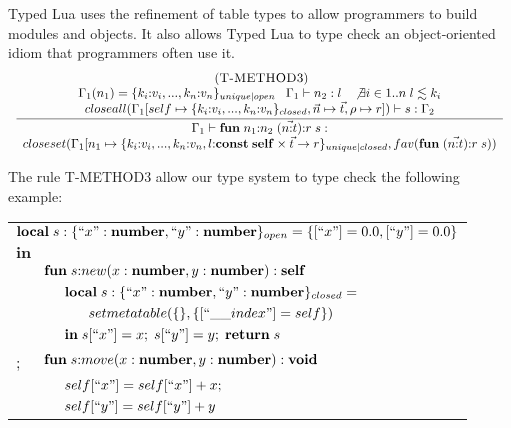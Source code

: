Typed Lua uses the refinement of table types to allow programmers to
build modules and objects.
It also allows Typed Lua to type check an object-oriented idiom that
programmers often use it.
\[
\begin{array}{c}
\; (\textsc{T-METHOD3})\\
\dfrac{\begin{array}{c}
       \Gamma_{1}(n_{1}) = \{k_{i}{:}v_{i}, ..., k_{n}{:}v_{n}\}_{unique|open} \;\;\;
       \Gamma_{1} \vdash n_{2} : l \;\;\;
       \not \exists i \in 1..n \; l \lesssim k_{i}\\
       closeall(\Gamma_{1}[self \mapsto \{k_{i}{:}v_{i}, ..., k_{n}{:}v_{n}\}_{closed}, \vec{n} \mapsto \vec{t}, \rho \mapsto r]) \vdash s:\Gamma_{2}
       \end{array}}
      {\begin{array}{c}
       \Gamma_{1} \vdash \mathbf{fun} \; n_{1}{:}n_{2} \; (\vec{n{:}t}){:}r \; s:\\
       closeset(\Gamma_{1}[n_{1} \mapsto \{k_{i}{:}v_{i}, ..., k_{n}{:}v_{n}, l{:}\mathbf{const} \; \mathbf{self} \times \vec{t} \rightarrow r\}_{unique|closed}, fav(\mathbf{fun} \; (\vec{n{:}t}){:}r \; s))
       \end{array}}
\end{array}
\]

The rule \textsc{T-METHOD3} allow our type system to type check the
following example:
\begin{center}
\begin{tabular}{llll}
\multicolumn{4}{l}{$\mathbf{local} \; s:\{``x":\mathbf{number}, ``y":\mathbf{number}\}_{open} = \{ [``x"] = 0.0, [``y"] = 0.0 \}$}\\
\multicolumn{4}{l}{$\mathbf{in}$}\\
& \multicolumn{3}{l}{$\mathbf{fun} \; s{:}new (x:\mathbf{number}, y:\mathbf{number}):\mathbf{self}$}\\
& & \multicolumn{2}{l}{$\mathbf{local} \; s:\{``x":\mathbf{number}, ``y":\mathbf{number}\}_{closed} =$}\\
& & & \multicolumn{1}{l}{$setmetatable(\{\}, \{ [``\string_\string_index"] = self \})$}\\
& & \multicolumn{2}{l}{$\mathbf{in} \; s[``x"] = x; \; s[``y"] = y; \; \mathbf{return} \; s$}\\
; & \multicolumn{3}{l}{$\mathbf{fun} \; s{:}move (x:\mathbf{number}, y:\mathbf{number}):\mathbf{void}$}\\
& & \multicolumn{2}{l}{$self[``x"] = self[``x"] + x;$}\\
& & \multicolumn{2}{l}{$self[``y"] = self[``y"] + y$}
\end{tabular}
\end{center}


